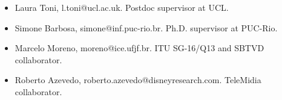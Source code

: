 \documentclass[10pt,a4paper,sans,colorlinks]{moderncv}
\begin{document}
\begin{itemize}
  \item Laura Toni, l.toni@ucl.ac.uk. Postdoc supervisor at UCL.
  \item Simone Barbosa, simone@inf.puc-rio.br. Ph.D. supervisor at PUC-Rio.
  \item Marcelo Moreno, moreno@ice.ufjf.br. ITU SG-16/Q13 and SBTVD collaborator.
  \item Roberto Azevedo, roberto.azevedo@disneyresearch.com. TeleMidia collaborator.
\end{itemize}
\end{document}
